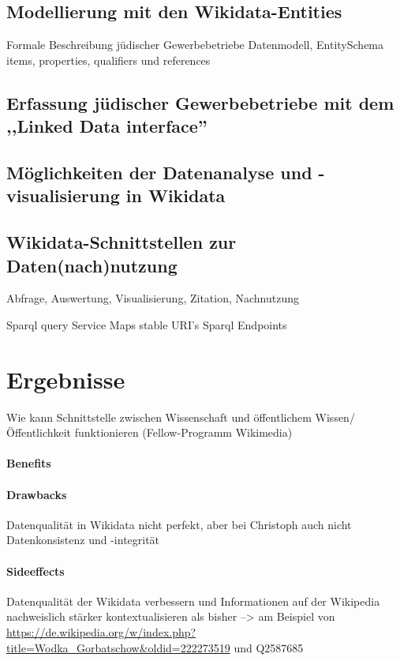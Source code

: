 \subsection{Modellierung mit den Wikidata-Entities}
Formale Beschreibung jüdischer Gewerbebetriebe Datenmodell, 
EntitySchema items, properties, qualifiers und references
\subsection{Erfassung jüdischer Gewerbebetriebe mit dem ,,Linked Data interface''}

\subsection{Möglichkeiten der Datenanalyse und -visualisierung in Wikidata}

\subsection{Wikidata-Schnittstellen zur Daten(nach)nutzung}

Abfrage, Auswertung, Visualisierung, Zitation, Nachnutzung

Sparql query Service
Maps
stable URI's
Sparql Endpoints

\section{Ergebnisse}

Wie kann Schnittstelle zwischen Wissenschaft und öffentlichem Wissen/ Öffentlichkeit funktionieren (Fellow-Programm Wikimedia)

\paragraph{Benefits}

\paragraph{Drawbacks}

Datenqualität in Wikidata nicht perfekt, aber bei Christoph auch nicht
Datenkonsistenz und -integrität

\paragraph{Sideeffects}

Datenqualität der Wikidata verbessern und Informationen auf der Wikipedia nachweislich stärker kontextualisieren als bisher
--> am Beispiel von \url{https://de.wikipedia.org/w/index.php?title=Wodka_Gorbatschow&oldid=222273519} und Q2587685


